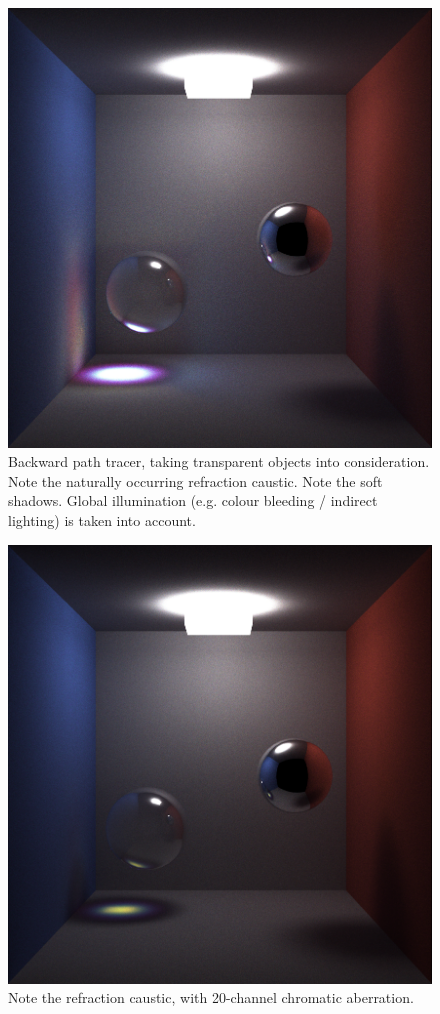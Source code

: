 \documentclass[10pt]{article}
\begin{document}
\begin{figure} 
\centering
  \includegraphics[width = 6 in]{v_rt_reflect_no_chromatic_aberration_low_res.png}
  \caption{  Backward path tracer, taking transparent objects into consideration. 
Note the naturally occurring refraction caustic.
Note the soft shadows.
Global illumination (e.g. colour bleeding / indirect lighting) is taken into account.
}
\end{figure}


\begin{figure} 
\centering
  \includegraphics[width = 6 in]{v_rt_reflect_chromatic_aberration_low_res.png}
  \caption{ Note the refraction caustic, with 20-channel chromatic aberration.
}
\end{figure}
\end{document}
